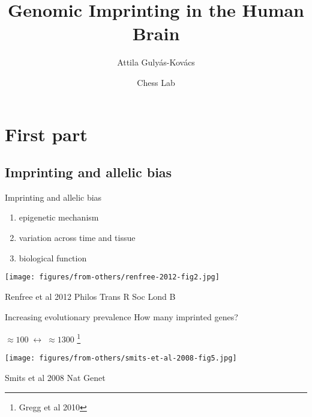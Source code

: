 \documentclass{beamer}
\title{Genomic Imprinting in the Human Brain}
\author{Attila Guly\'{a}s-Kov\'{a}cs}
\date{Chess Lab}
\begin{document}
\begin{frame}[plain, label=title]
\maketitle
\end{frame}

\section{First part}

\subsection{Imprinting and allelic bias}

\begin{frame}{Imprinting and allelic bias}
\begin{enumerate}
\item epigenetic mechanism
\item variation across time and tissue
\item biological function 
\end{enumerate}
\texttt{[image: figures/from-others/renfree-2012-fig2.jpg]}

{\tiny Renfree et al 2012 Philos Trans R Soc Lond B}

\end{frame}

\begin{frame}{Increasing evolutionary prevalence}{}
How many imprinted genes?

\(\approx 100 \; \leftrightarrow \; \approx 1300\) \footnote{Gregg et al 2010}

\texttt{[image: figures/from-others/smits-et-al-2008-fig5.jpg]}

{\tiny Smits et al 2008 Nat Genet}
\end{frame}
\end{document}
